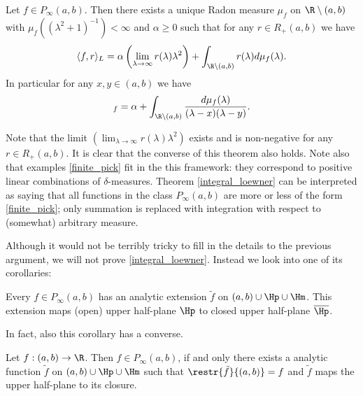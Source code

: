 \begin{lause}\label{integral_loewner}
	Let $f \in P_{\infty}(a, b)$. Then there exists a unique Radon measure $\mu_{f}$ on $\R \setminus (a, b)$ with $\mu_{f}((\lambda^2 + 1)^{-1}) < \infty$ and $\alpha \geq 0$ such that for any $r \in R_{+}(a, b)$ we have
	\begin{align*}
		\langle f, r \rangle_{L} = \alpha \left(\lim_{\lambda \to \infty} r(\lambda) \lambda^2 \right) + \int_{\R \setminus (a, b)} r(\lambda) d \mu_{f}(\lambda).
	\end{align*}
	In particular for any $x,y \in (a, b)$ we have
	\begin{align*}
		[x, y]_{f} = \alpha + \int_{\R \setminus (a, b)} \frac{d \mu_{f}(\lambda)}{(\lambda - x) (\lambda - y)}.
	\end{align*}
\end{lause}

Note that the limit $\left(\lim_{\lambda \to \infty} r(\lambda) \lambda^2 \right)$ exists and is non-negative for any $r \in R_{+}(a, b)$. It is clear that the converse of this theorem also holds. Note also that examples \ref{finite_pick} fit in the this framework: they correspond to positive linear combinations of $\delta$-measures. Theorem \ref{integral_loewner} can be interpreted as saying that all functions in the class $P_{\infty}(a, b)$ are more or less of the form \ref{finite_pick}; only summation is replaced with integration with respect to (somewhat) arbitrary measure.

Although it would not be terribly tricky to fill in the details to the previous argument, we will not prove \ref{integral_loewner}. Instead we look into one of its corollaries:

\begin{kor}
	Every $f \in P_{\infty}(a, b)$ has an analytic extension $\tilde{f}$ on $(a, b) \cup \Hp \cup \Hm$. This extension maps (open) upper half-plane $\Hp$ to closed upper half-plane $\overline{\Hp}$.
\end{kor}

In fact, also this corollary has a converse.

\begin{lause}\label{weak_loewner}
	Let $f : (a, b) \to \R$. Then $f \in P_{\infty}(a, b)$, if and only there exists a analytic function $\tilde{f}$ on $(a, b) \cup \Hp \cup \Hm$ such that $\restr{\tilde{f}}{(a, b)} = f$ and $\tilde{f}$ maps the upper half-plane to its closure.
\end{lause}

